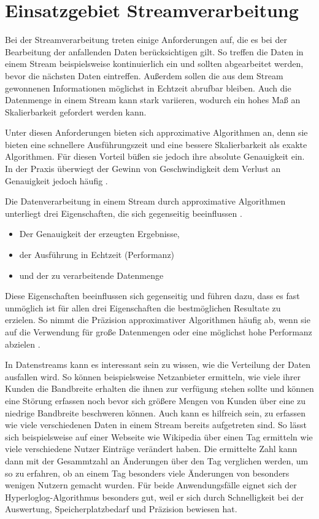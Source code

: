 \section{Einsatzgebiet Streamverarbeitung}
Bei der Streamverarbeitung treten einige Anforderungen auf, 
die es bei der Bearbeitung der anfallenden Daten berücksichtigen gilt. 
So treffen die Daten in einem Stream beispielsweise kontinuierlich ein und sollten abgearbeitet werden,
bevor die nächsten Daten eintreffen. 
Außerdem sollen die aus dem Stream gewonnenen Informationen möglichst in Echtzeit abrufbar bleiben.
Auch die Datenmenge in einem Stream kann stark variieren, wodurch ein hohes Maß an Skalierbarkeit gefordert werden kann.

Unter diesen Anforderungen bieten sich approximative Algorithmen an, denn sie bieten eine schnellere Ausführungszeit und eine bessere Skalierbarkeit als exakte Algorithmen. 
Für diesen Vorteil büßen sie jedoch ihre absolute Genauigkeit ein. 
In der Praxis überwiegt der Gewinn von Geschwindigkeit dem Verlust an Genauigkeit jedoch häufig \cite{maas2019}. 

Die Datenverarbeitung in einem Stream durch approximative Algorithmen unterliegt drei Eigenschaften, 
die sich gegenseitig beeinflussen \cite{maas2019}. 

\begin{itemize}
\item
Der Genauigkeit der erzeugten Ergebnisse,
\item
der Ausführung in Echtzeit (Performanz)
\item
und der zu verarbeitende Datenmenge
\end{itemize}

Diese Eigenschaften beeinflussen sich gegenseitig und führen dazu, 
dass es fast unmöglich ist für allen drei Eigenschaften die bestmöglichen Resultate zu erzielen.
So nimmt die Präzision approximativer Algorithmen häufig ab, 
wenn sie auf die Verwendung für große Datenmengen oder eine möglichst hohe Performanz abzielen \cite{maas2019}.

In Datenstreams kann es interessant sein zu wissen, wie die Verteilung der Daten ausfallen wird. So können beispielsweise Netzanbieter ermitteln, wie viele ihrer Kunden die Bandbreite erhalten die ihnen zur verfügung stehen sollte und können eine Störung erfassen noch bevor sich größere Mengen von Kunden über eine zu niedrige Bandbreite beschweren können.
Auch kann es hilfreich sein, zu erfassen wie viele verschiedenen Daten in einem Stream bereits aufgetreten sind. So lässt sich beispielsweise auf einer Webseite wie Wikipedia über einen Tag ermitteln wie viele verschiedene Nutzer Einträge verändert haben. Die ermittelte Zahl kann dann mit der Gesammtzahl an Änderungen über den Tag verglichen werden, um so zu erfahren, ob an einem Tag besonders viele Änderungen von  besonders wenigen Nutzern gemacht wurden.
Für beide Anwendungsfälle eignet sich der Hyperloglog-Algorithmus besonders gut, weil er sich durch Schnelligkeit bei der Auswertung, Speicherplatzbedarf und Präzision bewiesen hat.

